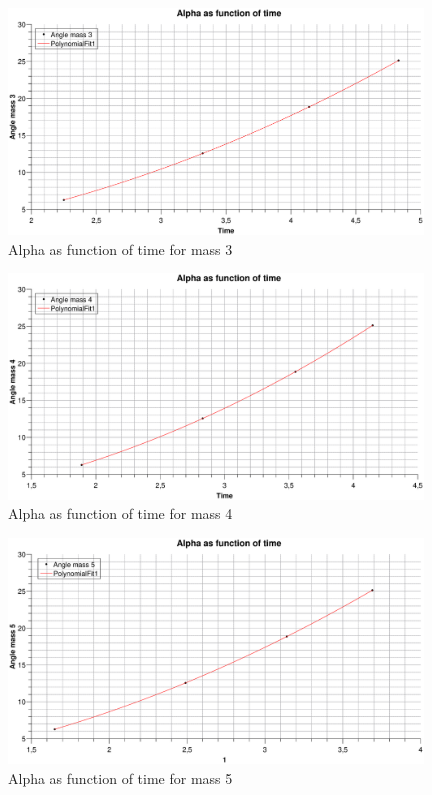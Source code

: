 \documentclass{scrartcl}
\begin{document}
    \begin{figure}[h]
        \centering
        \includegraphics[width=11cm]{mass3_AlphaFunctionOfTime.eps}
        \caption{Alpha as function of time for mass 3}
        \label{fig:my_label}
    \end{figure}
    
    \begin{figure}[h]
        \centering
        \includegraphics[width=11cm]{mass4_AlphaFunctionOfTime.eps}
        \caption{Alpha as function of time for mass 4}
        \label{fig:my_label}
    \end{figure}
    
    \begin{figure}[h]
        \centering
        \includegraphics[width=11cm]{mass5_AlphaFunctionOfTime.eps}
        \caption{Alpha as function of time for mass 5}
        \label{fig:my_label}
    \end{figure}
\end{document}
